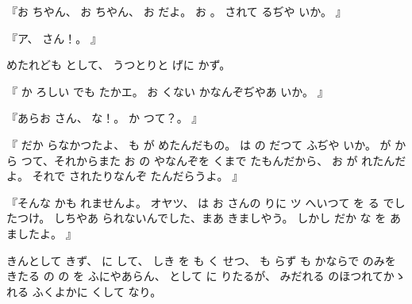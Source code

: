 『お
ちやん、
お
ちやん、
お
だよ。
お
。
されて
るぢや
いか。
』

『ア、
さん！。
』

めたれども
として、
うつとりと
げに
かず。

『
か
ろしい
でも
たかエ。
お
くない
かなんぞぢやあ
いか。
』

『あらお
さん、
な！。
か
つて？。
』

『
だか
らなかつたよ、
も
が
めたんだもの。
は
の
だつて
ふぢや
いか。
が
から
つて、それからまた
お
の
やなんぞを
くまで
たもんだから、
お
が
れたんだよ。
それで
されたりなんぞ
たんだらうよ。
』

『そんな
かも
れませんよ。
オヤツ、
は
お
さんの
りに
ツ
へいつて
を
る
でしたつけ。
しちやあ
られないんでした、まあ
きましやう。
しかし
だか
な
を
あ
ましたよ。
』

きんとして
きず、
に
して、
しき
を
も
く
せつ、
も
らず
も
かならで
のみを
きたる
の
の
を
ふにやあらん、
として
に
りたるが、
みだれる
のほつれてかゝれる
ふくよかに
くして
なり。


